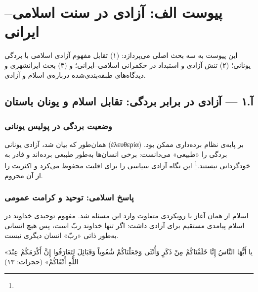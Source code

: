 \appendix
\section{پیوست الف: آزادی در سنت اسلامی–ایرانی}
\label{app:islamic}

\begin{tcolorbox}[wavebox, title={درباره‌ی این پیوست}]
این پیوست به سه بحث اصلی می‌پردازد: (۱) تقابل مفهوم آزادی اسلامی با بردگی یونانی؛ (۲) تنش آزادی و استبداد در حکمرانی اسلامی–ایرانی؛ و (۳) بحث ایرانشهری و دیدگاه‌های طبقه‌بندی‌شده درباره‌ی اسلام و آزادی.
\end{tcolorbox}

\subsection{آ.۱ — آزادی در برابر بردگی: تقابل اسلام و یونان باستان}
\label{subsec:islam_slavery}

\subsubsection{وضعیت بردگی در پولیس یونانی}

همان‌طور که بیان شد، آزادی یونانی (ἐλευθερία) بر پایه‌ی نظام برده‌داری ممکن بود.  بردگی را «طبیعی» می‌دانست: برخی انسان‌ها به‌طور طبیعی برده‌اند و قادر به خودگردانی نیستند.\footnote{} این نگاه آزادی سیاسی را برای اقلیت محفوظ می‌کرد و اکثریت را از آن محروم. %

\subsubsection{پاسخ اسلامی: توحید و کرامت عمومی}

اسلام از همان آغاز با رویکردی متفاوت وارد این مسئله شد. مفهوم توحیدی خداوند در اسلام پیامدی مستقیم برای آزادی داشت: اگر تنها خداوند ربّ است، پس هیچ انسانی به‌طور ذاتی «ربّ» انسان دیگری نیست.

\begin{tcolorbox}[quotebox]
«یا أَیُّهَا النَّاسُ إِنَّا خَلَقْنَاکُمْ مِنْ ذَکَرٍ وَأُنْثَى وَجَعَلْنَاکُمْ شُعُوباً وَقَبَائِلَ لِتَعَارَفُوا إِنَّ أَکْرَمَکُمْ عِنْدَ اللَّهِ أَتْقَاکُمْ» (حجرات: ۱۳)
\end{tcolorbox}

